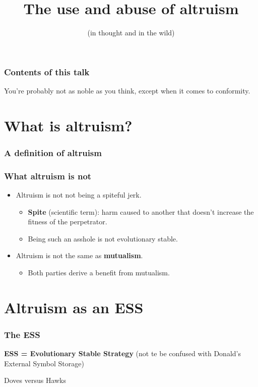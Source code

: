 \documentclass{beamer}
\begin{document}
\title{The use and abuse of altruism}
\subtitle{(in thought and in the wild)}

\begin{frame}
  \frametitle{Contents of this talk}
  \tableofcontents
  
  You're probably not as noble as you think,
  except when it comes to conformity.
\end{frame}

\section{What is altruism?}

\begin{frame}
  \frametitle{A definition of altruism}
\end{frame}

\begin{frame}
  \frametitle{What altruism is not}
  
  
  \begin{itemize}
    \item Altruism is not not being a spiteful jerk.
    
    \begin{itemize}
      \pause
      \item \textbf{Spite} (scientific term): harm caused to another that doesn't increase the fitness of the perpetrator.
      \item Being such an asshole is not evolutionary stable.
    \end{itemize}
    
    \pause
    
    \item Altruism is not the same as \textbf{mutualism}.
    
    \begin{itemize}
      \item Both parties derive a benefit from mutualism.
    \end{itemize}
  \end{itemize}
\end{frame}

\section{Altruism as an ESS}

\begin{frame}
  \frametitle{The ESS}
  
  \textbf{ESS = Evolutionary Stable Strategy}
  (not te be confused with Donald's External Symbol Storage)
  
  Doves versus Hawks
\end{frame}
\end{document}
